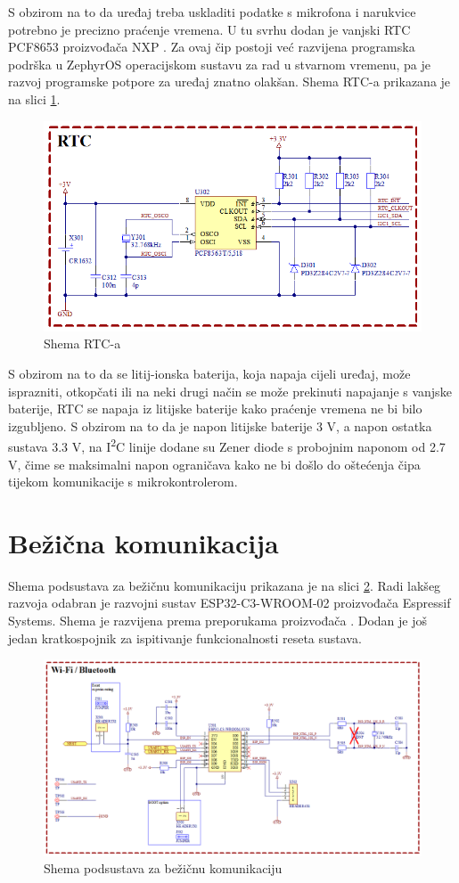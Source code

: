 S obzirom na to da uređaj treba uskladiti podatke s mikrofona i narukvice potrebno je precizno praćenje vremena. U tu svrhu dodan je vanjski RTC PCF8653 proizvođača NXP \cite{nxp:pcf8654}. Za ovaj čip postoji već razvijena programska podrška u ZephyrOS operacijskom sustavu za rad u stvarnom vremenu, pa je razvoj programske potpore za uređaj znatno olakšan. Shema RTC-a prikazana je na slici \ref{slk:RTC}.
\begin{figure}[hbt]
    \centering
    \includegraphics[width=10 cm]{Figures/RTC.png}
    \caption{Shema RTC-a}
    \label{slk:RTC}
\end{figure}
S obzirom na to da se litij-ionska baterija, koja napaja cijeli uređaj, može isprazniti, otkopčati ili na neki drugi način se može prekinuti napajanje s vanjske baterije, RTC se napaja iz litijske baterije kako praćenje vremena ne bi bilo izgubljeno. S obzirom na to da je napon litijske baterije 3 V, a napon ostatka sustava 3.3 V, na I\textsuperscript{2}C linije dodane su Zener diode s probojnim naponom od 2.7 V, čime se maksimalni napon ograničava kako ne bi došlo do oštećenja čipa tijekom komunikacije s mikrokontrolerom.

\section{Bežična komunikacija}
Shema podsustava za bežičnu komunikaciju prikazana je na slici \ref{slk:WIFI}. Radi lakšeg razvoja odabran je razvojni sustav ESP32-C3-WROOM-02 proizvođača Espressif Systems. Shema je razvijena prema preporukama proizvođača \cite{espressif:wroom02}. Dodan je još jedan kratkospojnik za ispitivanje funkcionalnosti reseta sustava.
\begin{figure}[!hbt]
    \centering
    \includegraphics[width=\textwidth]{Figures/WIRELESS.png}
    \caption{Shema podsustava za bežičnu komunikaciju}
    \label{slk:WIFI}
\end{figure}

